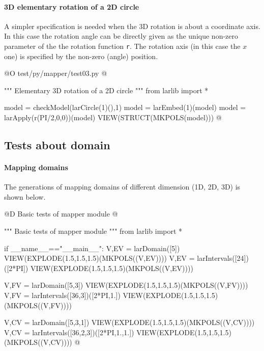 \documentclass[11pt,oneside]{article}	%
\begin{document}
\paragraph{3D elementary rotation of a 2D circle}
A simpler specification is needed when the 3D rotation is about a coordinate axis. In this case the rotation angle can be directly given as the unique non-zero parameter of the the rotation function \texttt{r}. The rotation axis (in this case the $x$ one) is specified by the non-zero (angle) position.

@O test/py/mapper/test03.py
@{""" Elementary 3D rotation of a 2D circle """
from larlib import *

model = checkModel(larCircle(1)(),1)
model = larEmbed(1)(model)
model = larApply(r(PI/2,0,0))(model)
VIEW(STRUCT(MKPOLS(model)))
@}




\subsection{Tests about domain}

\paragraph{Mapping domains}
The generations of mapping domains of different dimension (1D, 2D, 3D) is shown below.
	
@D Basic tests of mapper module
@{""" Basic tests of mapper module """
from larlib import *

if __name__=="__main__":
	V,EV = larDomain([5])
	VIEW(EXPLODE(1.5,1.5,1.5)(MKPOLS((V,EV))))
	V,EV = larIntervals([24])([2*PI])
	VIEW(EXPLODE(1.5,1.5,1.5)(MKPOLS((V,EV))))
		
	V,FV = larDomain([5,3])
	VIEW(EXPLODE(1.5,1.5,1.5)(MKPOLS((V,FV))))
	V,FV = larIntervals([36,3])([2*PI,1.])
	VIEW(EXPLODE(1.5,1.5,1.5)(MKPOLS((V,FV))))
		
	V,CV = larDomain([5,3,1])
	VIEW(EXPLODE(1.5,1.5,1.5)(MKPOLS((V,CV))))
	V,CV = larIntervals([36,2,3])([2*PI,1.,1.])
	VIEW(EXPLODE(1.5,1.5,1.5)(MKPOLS((V,CV))))
@}
\end{document}
